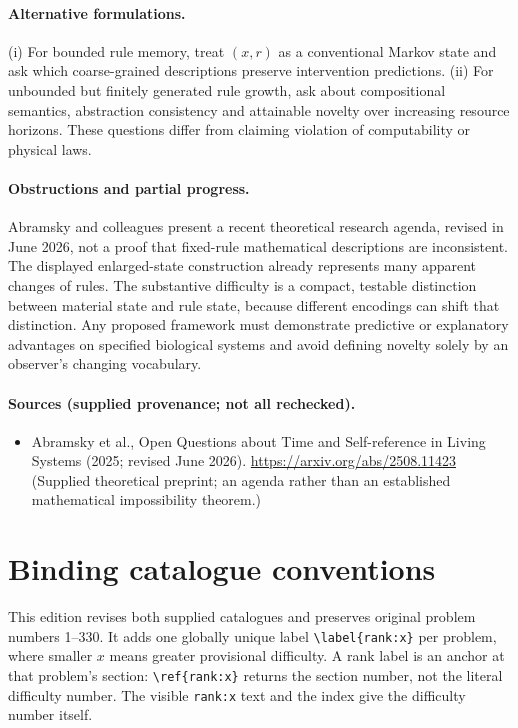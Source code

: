 \documentclass[11pt]{article}
\begin{document}
\paragraph{Alternative formulations.} (i) For bounded rule memory, treat $(x,r)$ as a conventional Markov state and ask which coarse-grained descriptions preserve intervention predictions. (ii) For unbounded but finitely generated rule growth, ask about compositional semantics, abstraction consistency and attainable novelty over increasing resource horizons. These questions differ from claiming violation of computability or physical laws.
\paragraph{Obstructions and partial progress.} Abramsky and colleagues present a recent theoretical research agenda, revised in June 2026, not a proof that fixed-rule mathematical descriptions are inconsistent. The displayed enlarged-state construction already represents many apparent changes of rules. The substantive difficulty is a compact, testable distinction between material state and rule state, because different encodings can shift that distinction. Any proposed framework must demonstrate predictive or explanatory advantages on specified biological systems and avoid defining novelty solely by an observer's changing vocabulary.
\paragraph{Sources (supplied provenance; not all rechecked).}
\begin{itemize}
\item Abramsky et al., Open Questions about Time and Self-reference in Living Systems (2025; revised June 2026). \url{https://arxiv.org/abs/2508.11423} (Supplied theoretical preprint; an agenda rather than an established mathematical impossibility theorem.)
\end{itemize}


\section*{Binding catalogue conventions}
This edition revises both supplied catalogues and preserves original problem numbers 1--330. It adds one globally unique label \verb|\label{rank:x}| per problem, where smaller $x$ means greater provisional difficulty. A rank label is an anchor at that problem's section: \verb|\ref{rank:x}| returns the section number, not the literal difficulty number. The visible \texttt{rank:x} text and the index give the difficulty number itself.
\end{document}
